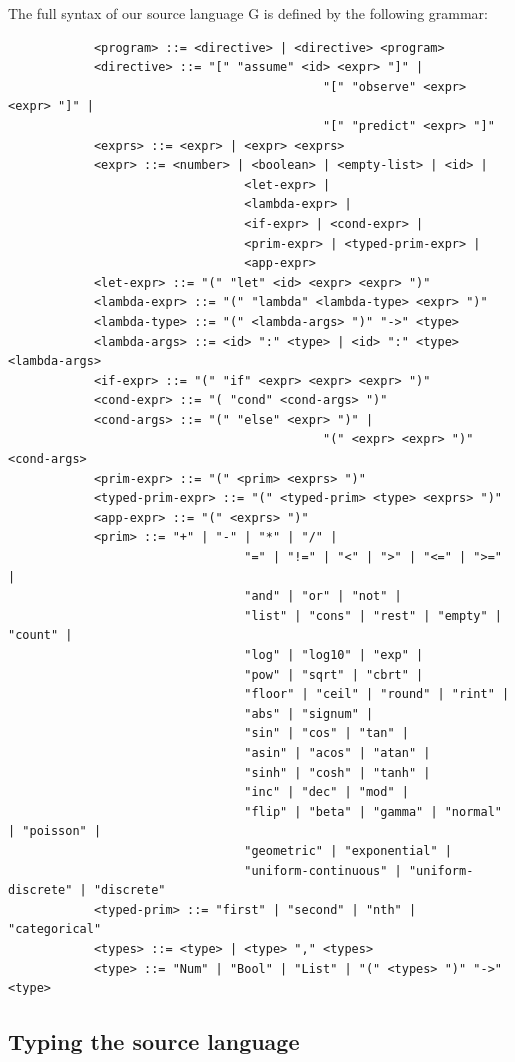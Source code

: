 \documentclass[a4paper]{article}
\begin{document}
The full syntax of our source language G is defined by the following grammar:
\begin{center}
	\begin{varwidth}{\linewidth}
		\small
		\begin{verbatim}
			<program> ::= <directive> | <directive> <program>
			<directive> ::= "[" "assume" <id> <expr> "]" |
											"[" "observe" <expr> <expr> "]" |
											"[" "predict" <expr> "]"
			<exprs> ::= <expr> | <expr> <exprs>
			<expr> ::= <number> | <boolean> | <empty-list> | <id> |
								 <let-expr> |
								 <lambda-expr> |
								 <if-expr> | <cond-expr> |
								 <prim-expr> | <typed-prim-expr> |
								 <app-expr>
			<let-expr> ::= "(" "let" <id> <expr> <expr> ")"
			<lambda-expr> ::= "(" "lambda" <lambda-type> <expr> ")"
			<lambda-type> ::= "(" <lambda-args> ")" "->" <type>
			<lambda-args> ::= <id> ":" <type> | <id> ":" <type> <lambda-args>
			<if-expr> ::= "(" "if" <expr> <expr> <expr> ")"
			<cond-expr> ::= "( "cond" <cond-args> ")"
			<cond-args> ::= "(" "else" <expr> ")" |
											"(" <expr> <expr> ")" <cond-args>
			<prim-expr> ::= "(" <prim> <exprs> ")"
			<typed-prim-expr> ::= "(" <typed-prim> <type> <exprs> ")"
			<app-expr> ::= "(" <exprs> ")"
			<prim> ::= "+" | "-" | "*" | "/" |
								 "=" | "!=" | "<" | ">" | "<=" | ">=" |
								 "and" | "or" | "not" |
								 "list" | "cons" | "rest" | "empty" | "count" |
								 "log" | "log10" | "exp" |
								 "pow" | "sqrt" | "cbrt" |
								 "floor" | "ceil" | "round" | "rint" |
								 "abs" | "signum" |
								 "sin" | "cos" | "tan" |
								 "asin" | "acos" | "atan" |
								 "sinh" | "cosh" | "tanh" |
								 "inc" | "dec" | "mod" |
								 "flip" | "beta" | "gamma" | "normal" | "poisson" |
								 "geometric" | "exponential" |
								 "uniform-continuous" | "uniform-discrete" | "discrete"
			<typed-prim> ::= "first" | "second" | "nth" | "categorical"
			<types> ::= <type> | <type> "," <types>
			<type> ::= "Num" | "Bool" | "List" | "(" <types> ")" "->" <type>
		\end{verbatim}
	\end{varwidth}
\end{center}




\subsection{Typing the source language}
\end{document}
